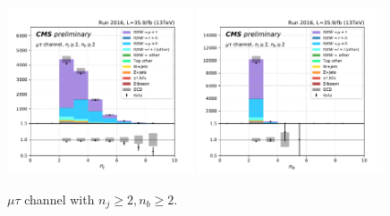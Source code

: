 \begin{figure}[ht]
    \includegraphics[width=0.49\textwidth]{chapters/Analysis/sectionPlots/figures/kinematics_pickles/mutau/2b/mutau_2b_nJets.pdf}
    \includegraphics[width=0.49\textwidth]{chapters/Analysis/sectionPlots/figures/kinematics_pickles/mutau/2b/mutau_2b_nBJets.pdf}
    
    \caption{$\mu\tau$ channel with $n_j\geq2, n_b\geq2$.}
\end{figure}


